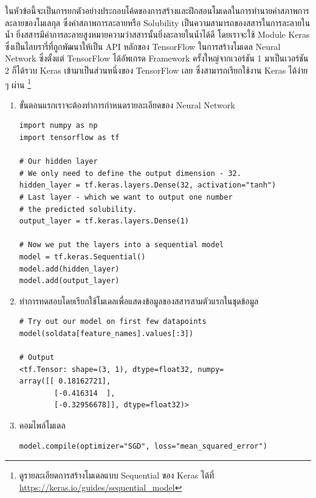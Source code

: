 ในหัวข้อนี้จะเป็นการยกตัวอย่างประกอบโค้ดของการสร้างและฝึกสอนโมเดลในการทำนายค่าสภาพการละลายของโมเลกุล ซึ่งค่าสภาพการละลายหรือ Solubility เป็นความสามารถของสสารในการละลายในน้ำ ยิ่งสสารมีค่าการละลายสูงหมายความว่าสสารนั้นยิ่งละลายในน้ำได้ดี โดยเราจะใช้ Module Keras ซึ่งเป็นไลบรารี่ที่ถูกพัฒนาให้เป็น API หลักของ TensorFlow ในการสร้างโมเดล Neural Network ซึ่งตั้งแต่ TensorFlow ได้อัพเกรด Framework ครั้งใหญ่จากเวอร์ชัน 1 มาเป็นเวอร์ชัน 2 ก็ได้รวบ Keras เข้ามาเป็นส่วนหนึ่งของ TensorFlow เลย ซึ่งสามารถเรียกใช้งาน Keras ได้ง่าย ๆ ผ่าน \footnote{ดูรายละเอียดการสร้างโมเดลแบบ Sequential ของ Keras ได้ที่ \url{https://keras.io/guides/sequential_model}}

\begin{enumerate}
    \item ขั้นตอนแรกเราจะต้องทำการกำหนดรายละเอียดของ Neural Network

          \begin{lstlisting}[style=MyPython]
import numpy as np
import tensorflow as tf

# Our hidden layer
# We only need to define the output dimension - 32.
hidden_layer = tf.keras.layers.Dense(32, activation="tanh")
# Last layer - which we want to output one number
# the predicted solubility.
output_layer = tf.keras.layers.Dense(1)

# Now we put the layers into a sequential model
model = tf.keras.Sequential()
model.add(hidden_layer)
model.add(output_layer)
\end{lstlisting}

          \vspace{1em}

    \item ทำการทดสอบโดยเรียกใช้โมเดลเพื่อแสดงข้อมูลของสสารสามตัวแรกในชุดข้อมูล

          \begin{lstlisting}[style=MyPython]
# Try out our model on first few datapoints
model(soldata[feature_names].values[:3])

# Output
<tf.Tensor: shape=(3, 1), dtype=float32, numpy=
array([[ 0.18162721],
        [-0.416314  ],
        [-0.32956678]], dtype=float32)>
\end{lstlisting}

          \vspace{1em}

    \item คอมไพล์โมเดล

          \begin{lstlisting}[style=MyPython]
model.compile(optimizer="SGD", loss="mean_squared_error")
\end{lstlisting}


\end{enumerate}
